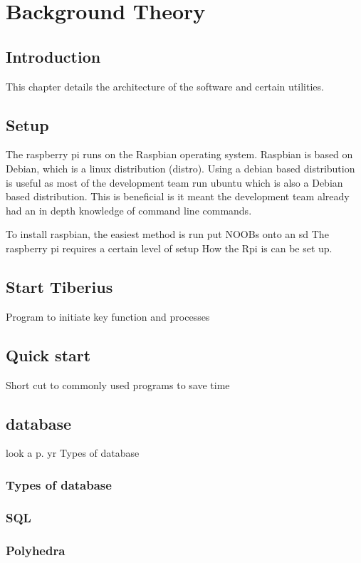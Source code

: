 \section{Background Theory}


\pagestyle{aidan}

\subsection{Introduction}
This chapter details the architecture of the software and certain utilities.

\subsection{Setup}
The raspberry pi runs on the Raspbian operating system. Raspbian is based on Debian, which is a linux distribution (distro). Using a debian based distribution is useful as most of the development team run ubuntu which is also a Debian based distribution. This is beneficial is it meant the development team already had an in depth knowledge of command line commands.

To install raspbian, the easiest method is run put NOOBs onto an sd 
The raspberry pi requires a certain level of setup
How the Rpi is can be set up.

\subsection{Start Tiberius}
Program to initiate key function and processes

\subsection{Quick start}
Short cut to commonly used programs to save time

\subsection{database}
look a p. yr
Types of database

\subsubsection{Types of database}

\subsubsection{SQL}

\subsubsection{Polyhedra }











